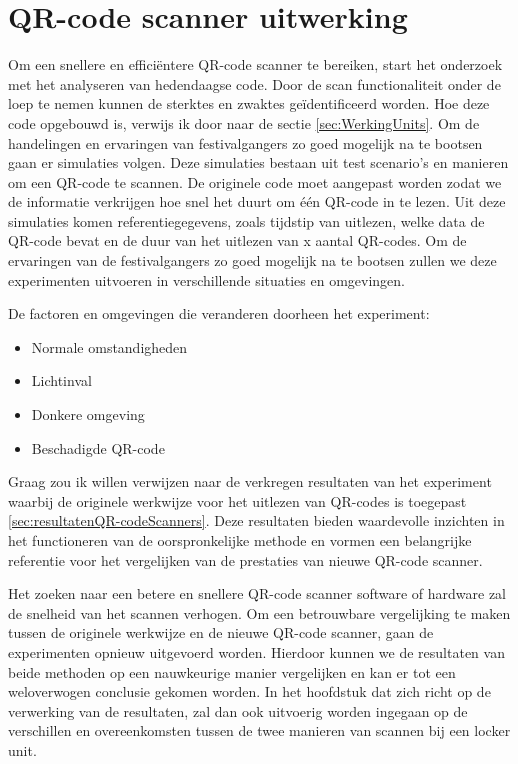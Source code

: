 \section{QR-code scanner uitwerking}%
\label{sec:scannerUitwerking}

Om een snellere en efficiëntere QR-code scanner te bereiken, start het onderzoek met het analyseren van hedendaagse code. Door de scan functionaliteit onder de loep te nemen kunnen de sterktes en zwaktes geïdentificeerd worden. Hoe deze code opgebouwd is, verwijs ik door naar de sectie \ref{sec:WerkingUnits}.
Om de handelingen en ervaringen van festivalgangers zo goed mogelijk na te bootsen gaan er simulaties volgen. Deze simulaties bestaan uit test scenario’s en manieren om een QR-code te scannen. De originele code moet aangepast worden zodat we de informatie verkrijgen hoe snel het duurt om één QR-code in te lezen. Uit deze simulaties komen referentiegegevens, zoals tijdstip van uitlezen, welke data de QR-code bevat en de duur van het uitlezen van x aantal QR-codes. Om de ervaringen van de festivalgangers zo goed mogelijk na te bootsen zullen we deze experimenten uitvoeren in verschillende situaties en omgevingen.

De factoren en omgevingen die veranderen doorheen het experiment:

\begin{itemize}
    \item Normale omstandigheden
    \item Lichtinval
    \item Donkere omgeving
    \item Beschadigde QR-code     
\end{itemize}

Graag zou ik willen verwijzen naar de verkregen resultaten van het experiment waarbij de originele werkwijze voor het uitlezen van QR-codes is toegepast \ref{sec:resultatenQR-codeScanners}. Deze resultaten bieden waardevolle inzichten in het functioneren van de oorspronkelijke methode en vormen een belangrijke referentie voor het vergelijken van de prestaties van nieuwe QR-code scanner.

Het zoeken naar een betere en snellere QR-code scanner software of hardware zal de snelheid van het scannen verhogen. Om een betrouwbare vergelijking te maken tussen de originele werkwijze en de nieuwe QR-code scanner, gaan de experimenten opnieuw uitgevoerd worden. Hierdoor kunnen we de resultaten van beide methoden op een nauwkeurige manier vergelijken en kan er tot een weloverwogen conclusie gekomen worden. In het hoofdstuk dat zich richt op de verwerking van de resultaten, zal dan ook uitvoerig worden ingegaan op de verschillen en overeenkomsten tussen de twee manieren van scannen bij een locker unit.

